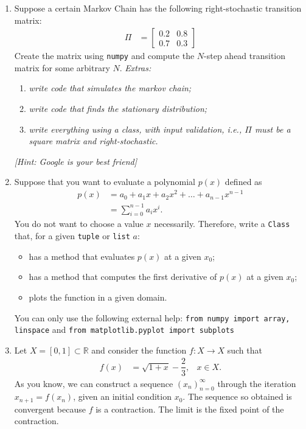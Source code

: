 \documentclass[a4paper,11pt]{article}
\begin{document}
\begin{enumerate}
		\item
			Suppose a certain Markov Chain has the following right-stochastic transition matrix:
			\begin{align*}
				\Pi &=
				\begin{bmatrix}
					0.2 & 0.8 \\
					0.7 & 0.3
				\end{bmatrix}
			\end{align*}
			Create the matrix using \texttt{numpy} and compute the $N$-step ahead transition matrix for some arbitrary $N$.
			\emph{Extras:}
			\begin{enumerate}
				\item \emph{write code that simulates the markov chain;}
				\item \emph{write code that finds the stationary distribution;}
				\item \emph{write everything using a class, with input validation, i.e., $\Pi$ must be a square matrix and right-stochastic.}
			\end{enumerate}
			\emph{[Hint: Google is your best friend]}

		\item
			Suppose that you want to evaluate a polynomial $p(x)$ defined as
			\begin{align*}
				p(x) &= a_0 + a_1 x + a_2 x^2 + \ldots + a_{n-1} x^{n-1} \\
						 &= \sum_{i=0}^{n-1} a_i x^i.
			\end{align*}
			You do not want to choose a value $x$ necessarily.
			Therefore, write a \texttt{Class} that, for a given \texttt{tuple} or \texttt{list} $a$:
			\begin{itemize}
				\item has a method that evaluates $p(x)$ at a given $x_0$;
				\item has a method that computes the first derivative of $p(x)$ at a given $x_0$;
				\item plots the function in a given domain.
			\end{itemize}
			You can only use the following external help: \texttt{from numpy import array, linspace} and \texttt{from matplotlib.pyplot import subplots}
		
		\item 
			Let $X = [0,1] \subset \mathbb{R}$ and consider the function $f : X \to X$ such that
			\begin{align*}
				f(x) &= \sqrt{1+x} - \dfrac{2}{3},
					& x \in X.
			\end{align*}
			As you know, we can construct a sequence ${(x_n)}_{n=0}^{\infty}$ through the iteration $x_{n+1} = f(x_n)$, given an initial condition $x_0$.
			The sequence so obtained is convergent because $f$ is a contraction.
			The limit is the fixed point of the contraction.


\end{enumerate}
\end{document}
